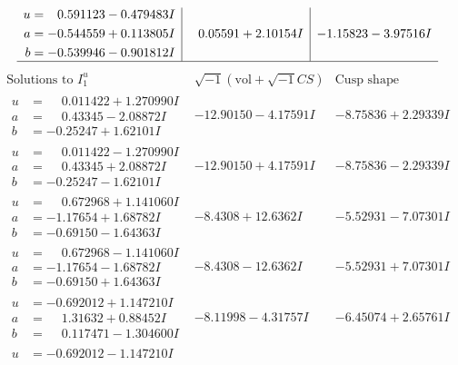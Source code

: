\documentclass[1p]{elsarticle_modified}
\theoremstyle{definition}
\newcommand{\I}{\sqrt{-1}}
\begin{document}
$$\begin{array}{c|c|c}
\begin{aligned}
u &= \phantom{-}0.591123 - 0.479483 I \\
a &= -0.544559 + 0.113805 I \\
b &= -0.539946 - 0.901812 I\end{aligned}
 & \phantom{-}0.05591 + 2.10154 I & -1.15823 - 3.97516 I\\
 \hline 
 \end{array}$$\newpage$$\begin{array}{c|c|c}  
\text{Solutions to }I^u_{1}& \I (\text{vol} + \sqrt{-1}CS) & \text{Cusp shape}\\
 \hline 
\begin{aligned}
u &= \phantom{-}0.011422 + 1.270990 I \\
a &= \phantom{-}0.43345 - 2.08872 I \\
b &= -0.25247 + 1.62101 I\end{aligned}
 & -12.90150 - 4.17591 I & -8.75836 + 2.29339 I \\ \hline\begin{aligned}
u &= \phantom{-}0.011422 - 1.270990 I \\
a &= \phantom{-}0.43345 + 2.08872 I \\
b &= -0.25247 - 1.62101 I\end{aligned}
 & -12.90150 + 4.17591 I & -8.75836 - 2.29339 I \\ \hline\begin{aligned}
u &= \phantom{-}0.672968 + 1.141060 I \\
a &= -1.17654 + 1.68782 I \\
b &= -0.69150 - 1.64363 I\end{aligned}
 & -8.4308 + 12.6362 I & -5.52931 - 7.07301 I \\ \hline\begin{aligned}
u &= \phantom{-}0.672968 - 1.141060 I \\
a &= -1.17654 - 1.68782 I \\
b &= -0.69150 + 1.64363 I\end{aligned}
 & -8.4308 - 12.6362 I & -5.52931 + 7.07301 I \\ \hline\begin{aligned}
u &= -0.692012 + 1.147210 I \\
a &= \phantom{-}1.31632 + 0.88452 I \\
b &= \phantom{-}0.117471 - 1.304600 I\end{aligned}
 & -8.11998 - 4.31757 I & -6.45074 + 2.65761 I \\ \hline\begin{aligned}
u &= -0.692012 - 1.147210 I \\

\end{aligned}
\end{array}$$
\end{document}
